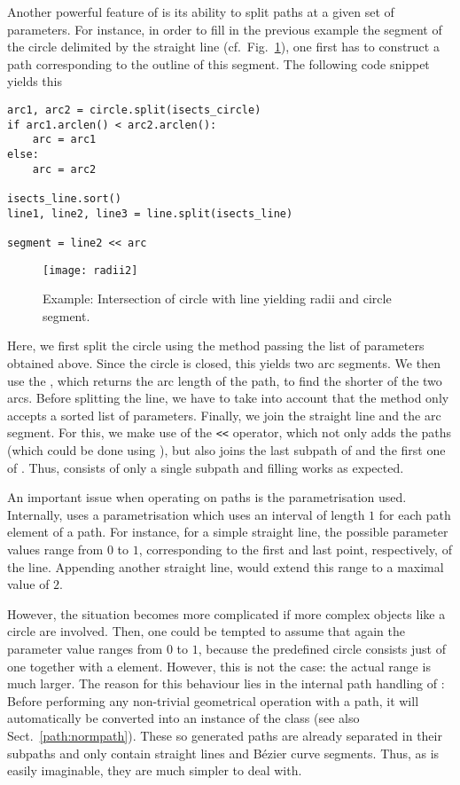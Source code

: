 Another powerful feature of \PyX{} is its ability to split paths at a
given set of parameters. For instance, in order to fill in the
previous example the segment of the circle delimited by the straight
line (cf.\ Fig.~\ref{fig:radii2}), one first has to construct a path
corresponding to the outline of this segment. The following code
snippet yields this 
\begin{verbatim}
arc1, arc2 = circle.split(isects_circle)
if arc1.arclen() < arc2.arclen():
    arc = arc1
else:
    arc = arc2

isects_line.sort()
line1, line2, line3 = line.split(isects_line)

segment = line2 << arc
\end{verbatim}
\begin{figure}
\centerline{\texttt{[image: radii2]}}
\caption{Example: Intersection of circle with line yielding radii and
  circle segment.}
\label{fig:radii2}
\end{figure}
Here, we first split the circle using the  method passing
the list of parameters obtained above. Since the circle is closed,
this yields two arc segments. We then use the , which
returns the arc length of the path, to find the shorter of the two
arcs. Before splitting the line, we have to take into account that
the  method only accepts a sorted list of parameters.
Finally, we join the straight line and the arc segment. For
this, we make use of the \verb|<<| operator, which not only adds
the paths (which could be done using ), but also
joins the last subpath of  and the first one of
. Thus,  consists of only a single subpath
and filling works as expected.

An important issue when operating on paths is the parametrisation
used. Internally, \PyX{} uses a parametrisation which uses an interval
of length $1$ for each path element of a path. For instance, for a
simple straight line, the possible parameter values range from $0$ to
$1$, corresponding to the first and last point, respectively, of the
line. Appending another straight line, would extend this range to a
maximal value of $2$. 

However, the situation becomes more complicated if more complex
objects like a circle are involved. Then, one could be tempted to
assume that again the parameter value ranges from $0$ to $1$, because
the predefined circle consists just of one  together with a
 element. However, this is not the case: the actual
range is much larger. The reason for this behaviour lies in the
internal path handling of \PyX: Before performing any non-trivial
geometrical operation with a path, it will automatically be converted
into an instance of the  class (see also
Sect.~\ref{path:normpath}). These so generated paths are already
separated in their subpaths and only contain straight lines and
B\'ezier curve segments. Thus, as is easily imaginable, they are much
simpler to deal with.

